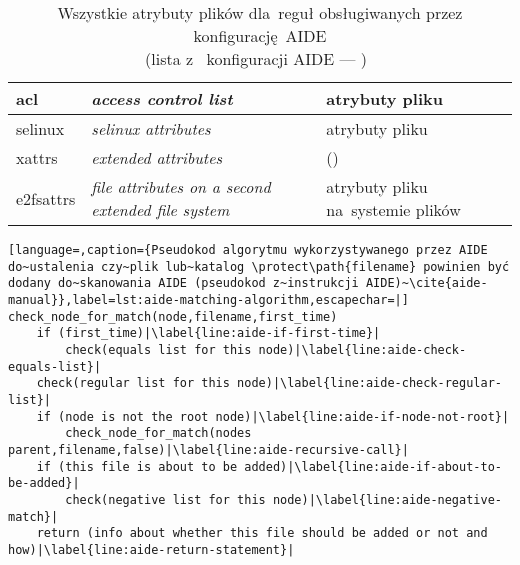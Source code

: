 \documentclass[thesis]{subfiles}
\begin{document}
\begin{table}
\begin{tabular}{>{\ttfamily}l|>{\itshape}l|l}
		acl                        & access control list                    & atrybuty pliku \aclwiki                 \\\hline
		selinux                    & selinux attributes                     & atrybuty pliku \selinuxwiki             \\\hline
		xattrs                     & extended attributes                    & \xattrsman (\xattrswiki)                \\\hline
		e2fsattrs                  & file attributes on a second extended file system & atrybuty pliku na~systemie plików \extwiki
	\end{tabular}
	\caption[Wszystkie atrybuty plików dla~reguł obsługiwanych przez konfigurację~AIDE]{Wszystkie atrybuty plików dla~reguł obsługiwanych przez konfigurację~AIDE\\(lista z~\emph{} konfiguracji AIDE --- )~\cite{aide-manual}}
	\label{tab:aide-file-attrs}
\end{table}

\begin{lstlisting}[language=,caption={Pseudokod algorytmu wykorzystywanego przez AIDE do~ustalenia czy~plik lub~katalog \protect\path{filename} powinien być dodany do~skanowania AIDE (pseudokod z~instrukcji AIDE)~\cite{aide-manual}},label=lst:aide-matching-algorithm,escapechar=|]
check_node_for_match(node,filename,first_time)
    if (first_time)|\label{line:aide-if-first-time}|
        check(equals list for this node)|\label{line:aide-check-equals-list}|
    check(regular list for this node)|\label{line:aide-check-regular-list}|
    if (node is not the root node)|\label{line:aide-if-node-not-root}|
        check_node_for_match(nodes parent,filename,false)|\label{line:aide-recursive-call}|
    if (this file is about to be added)|\label{line:aide-if-about-to-be-added}|
        check(negative list for this node)|\label{line:aide-negative-match}|
    return (info about whether this file should be added or not and how)|\label{line:aide-return-statement}|
\end{lstlisting}

%
%
\end{document}
